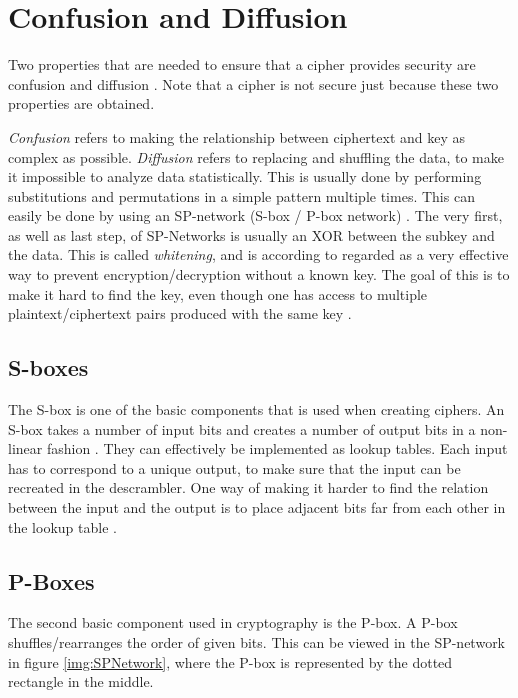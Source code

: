 
\section{Confusion and Diffusion}\label{ch:ConfDiff}
Two properties that are needed to ensure that a cipher provides security are 
confusion and diffusion \citep{Shannon:1949}. Note that a cipher is not secure 
just because these two properties are obtained.

\emph{Confusion} refers to making the relationship between ciphertext and key as 
complex as possible. \emph{Diffusion} refers to replacing and shuffling the 
data, to make it impossible to analyze data statistically. This is usually done 
by performing substitutions and permutations in a simple pattern multiple times. 
This can easily be done by using an SP-network (S-box / P-box network) 
\citep[pp. 74--79]{Stinson:2006}. The very first, as well as last step, of 
SP-Networks is usually an XOR between the subkey and the data. This is called 
\emph{whitening}, and is according to \citet[p. 75]{Stinson:2006} regarded as a 
very effective way to prevent encryption/decryption without a known key. 
The goal of this is to make it hard to find the key, even though one has access 
to multiple plaintext/ciphertext pairs produced with the same key 
\citep{Shannon:1949}.

\subsection{S-boxes}
The S-box is one of the basic components that is used when creating ciphers. 
An S-box takes a number of input bits and creates a number of output bits in 
a non-linear fashion \citep[pp. 74--75]{Stinson:2006}. They can effectively be 
implemented as lookup tables. Each input has to correspond to a unique output, 
to make sure that the input can be recreated in the descrambler. One way of 
making it harder to find the relation between the input and the output is to 
place adjacent bits far from each other in the lookup table
. 


\subsection{P-Boxes}
The second basic component used in cryptography is the P-box. A P-box 
shuffles/rearranges the order of given bits. This can be viewed in the 
SP-network in figure \ref{img:SPNetwork}, where the P-box is represented by the 
dotted rectangle in the middle.

